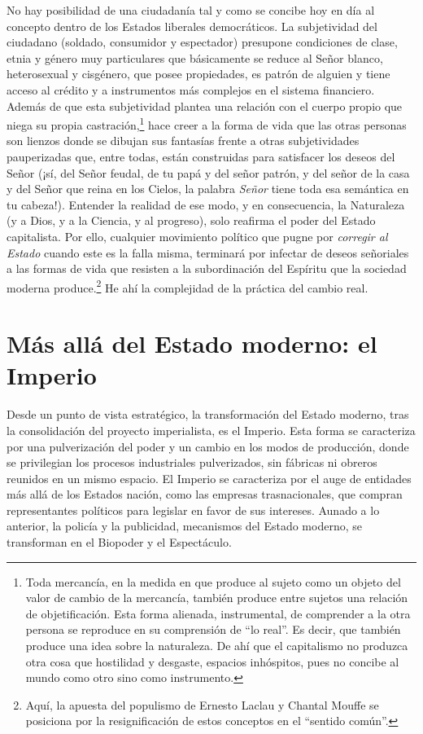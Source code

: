 No hay posibilidad de una ciudadanía tal y como se concibe hoy en día al concepto dentro de los Estados liberales democráticos. La subjetividad del ciudadano (soldado, consumidor y espectador) presupone condiciones de clase, etnia y género muy particulares que básicamente se reduce al Señor blanco, heterosexual y cisgénero, que posee propiedades, es patrón de alguien y tiene acceso al crédito y a instrumentos más complejos en el sistema financiero. Además de que esta subjetividad plantea una relación con el cuerpo propio que niega su propia castración,\footnote{Toda mercancía, en la medida en que produce al sujeto como un objeto del valor de cambio de la mercancía, también produce entre sujetos una relación de objetificación. Esta forma alienada, instrumental, de comprender a la otra persona se reproduce en su comprensión de \enquote{lo real}. Es decir, que también produce una idea sobre la naturaleza. De ahí que el capitalismo no produzca otra cosa que hostilidad y desgaste, espacios inhóspitos, pues no concibe al mundo como otro sino como instrumento.} hace creer a la forma de vida que las otras personas son lienzos donde se dibujan sus fantasías frente a otras subjetividades pauperizadas que, entre todas, están construidas para satisfacer los deseos del Señor (¡sí, del Señor feudal, de tu papá y del señor patrón, y del señor de la casa y del Señor que reina en los Cielos, la palabra \emph{Señor} tiene toda esa semántica en tu cabeza!). Entender la realidad de ese modo, y en consecuencia, la Naturaleza (y a Dios, y a la Ciencia, y al progreso), solo reafirma el poder del Estado capitalista. Por ello, cualquier movimiento político que pugne por \emph{corregir al Estado} cuando este es la falla misma, terminará por infectar de deseos señoriales a las formas de vida que resisten a la subordinación del Espíritu que la sociedad moderna produce.\footnote{Aquí, la apuesta del populismo de Ernesto Laclau y Chantal Mouffe se posiciona por la resignificación de estos conceptos en el \enquote{sentido común}.} He ahí la complejidad de la práctica del cambio real.

\section{Más allá del Estado moderno: el Imperio}
\label{sec:imperio}

Desde un punto de vista estratégico, la transformación del Estado moderno, tras la consolidación del proyecto imperialista, es el Imperio. Esta forma se caracteriza por una pulverización del poder y un cambio en los modos de producción, donde se privilegian los procesos industriales pulverizados, sin fábricas ni obreros reunidos en un mismo espacio. El Imperio se caracteriza por el auge de entidades más allá de los Estados nación, como las empresas trasnacionales, que compran representantes políticos para legislar en favor de sus intereses. Aunado a lo anterior, la policía y la publicidad, mecanismos del Estado moderno, se transforman en el Biopoder y el Espectáculo.

